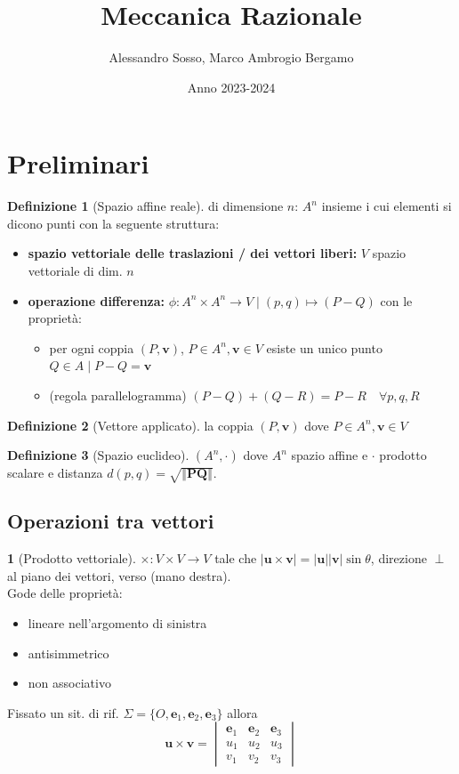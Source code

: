 \documentclass[a4paper,10pt]{article}
\title{\textbf{Meccanica Razionale}}
\author{Alessandro Sosso, Marco Ambrogio Bergamo}
\date{Anno 2023-2024}
\theoremstyle{definition}
\newcommand{\bv}{\boldsymbol} %
\theoremstyle{indentdefinition}
\newtheorem{defn}{Definizione}[section]
\theoremstyle{indenttheorem}
\theoremstyle{myremark}
\theoremstyle{indentgeneral}
\newtheorem*{gen}{}
\begin{document}
\maketitle
\tableofcontents{}

\section*{Preliminari}
\begin{defn}[Spazio affine reale]
    di dimensione $n$: ${A}^n$ insieme i cui elementi si dicono punti con la seguente struttura:
    \begin{itemize}[leftmargin=15mm]
        \item \textbf{spazio vettoriale delle traslazioni / dei vettori liberi:}   $V$ spazio vettoriale di dim. $n$
        \item \textbf{operazione differenza:} $\phi: A^n\times A^n \to V \mid (p,q)\mapsto (P-Q)$ con le proprietà:
        \begin{itemize}
            \item per ogni coppia $(P,\bv{v})$, $P\in A^n,\bv{v}\in V$ esiste un unico punto $Q\in A \mid P-Q=\bv{v}$
            \item (regola parallelogramma) $(P-Q)+(Q-R)=P-R \quad \forall p,q,R$
        \end{itemize}
    \end{itemize}
\end{defn}

\begin{defn}[Vettore applicato]
la coppia $(P,\bv{v})$ dove  $P\in A^n,\bv{v}\in V$
\end{defn}

\begin{defn}[Spazio euclideo]
    $(A^n, \cdot)$ dove $A^n$ spazio affine e $\cdot$ prodotto scalare e distanza $d\left(p,q\right)=\sqrt{\left\Vert \boldsymbol{PQ}\right\Vert }$. 
\end{defn}

\subsection{Operazioni tra vettori}

\begin{gen}[Prodotto vettoriale]
$\times:V\times V \to V$ tale che $|\bv{u}\times \bv{v}|=|\bv{u}||\bv{v}|\sin\theta$, direzione $\perp$ al piano dei vettori, verso (mano destra).\\
Gode delle proprietà:
\begin{itemize}[leftmargin=15mm]
    \item lineare nell'argomento di sinistra
    \item antisimmetrico
    \item non associativo
\end{itemize}
Fissato un sit. di rif. $\Sigma=\{O,\bv{e}_1,\bv{e}_2,\bv{e}_3\}$ allora $$\bv{u}\times \bv{v} = \begin{vmatrix} \bv{e}_1 & \bv{e}_2 & \bv{e}_3 \\ u_1 & u_2 & u_3 \\ v_1 & v_2 & v_3\end{vmatrix}$$
\end{gen}
\end{document}
